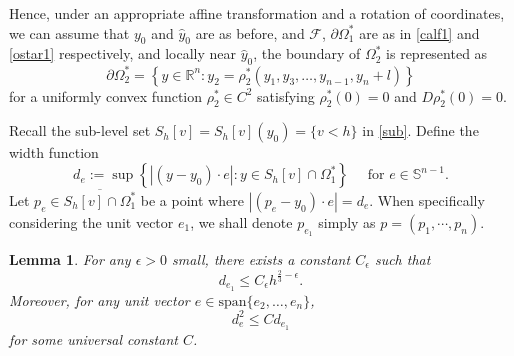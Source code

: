 \documentclass[11pt]{amsart}
\theoremstyle{plain}
\newtheorem{lemma}{Lemma}[section]
\newcommand{\0}{\textbf{0}}
\numberwithin{equation}{section}
\numberwithin{equation}{section}
\numberwithin{figure}{section}
\begin{document}
Hence, under an appropriate affine transformation and a rotation of coordinates, we can assume that \( y_0 \) and \( \hat{y}_0 \) are as before, and \( \mathcal{F} \), \( \partial\Omega^*_1 \) are as in \eqref{calf1} and \eqref{ostar1} respectively, and locally near \( \hat{y}_0 \), the boundary of \( \Omega_2^* \)  is represented as
\[
\partial\Omega_2^* = \left\{ y\in\mathbb{R}^n : y_2 = \rho_2^*(y_1, y_3, \ldots, y_{n-1}, y_n + l) \right\}
\]
for a uniformly convex function \( \rho_2^* \in C^2 \) satisfying \( \rho_2^*(0) = 0 \) and \( D\rho_2^*(0) = 0 \).


Recall the sub-level set $S_h[v]=S_h[v](y_0)=\{v<h\}$ in \eqref{sub}.
Define the width function
\[
d_e := \sup \left\{ |(y-y_0) \cdot e| : y \in S_h[v] \cap \Omega_1^* \right\}\quad \mbox{ for } e\in\mathbb{S}^{n-1}. 
\]
Let $p_e \in \overline{S_h[v] \cap \Omega_1^*}$ be a point where $|(p_e-y_0) \cdot e| = d_e$. When specifically considering the unit vector $e_1$, we shall denote $p_{e_1}$ simply as $p=(p_1, \cdots, p_n)$.


\begin{lemma}\label{ide1}
For any $\epsilon>0$ small, there exists a constant $C_\epsilon$ such that 
	\[ d_{e_1} \leq C_{\epsilon}h^{\frac{2}{3} - \epsilon}. \]
Moreover, for any unit vector $e \in \mathrm{span}\{e_2, \ldots, e_n\}$,  
	\[ d_e^2 \leq C d_{e_1} \] 
for some universal constant $C$. 
\end{lemma}
\end{document}
